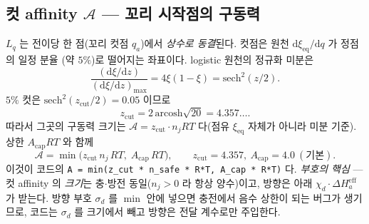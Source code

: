 \documentclass[11pt,a4paper]{article}
\newcommand{\dd}{\mathrm{d}}
\newcommand{\eff}{\mathrm{eff}}
\newcommand{\eq}{\mathrm{eq}}
\newcommand{\code}[1]{\texttt{#1}}
\begin{document}
\subsection{컷 affinity $\mathcal A$ — 꼬리 시작점의 구동력}
$L_q$ 는 전이당 한 점(꼬리 컷점 $q_a$)에서 \emph{상수로 동결}된다. 컷점은 원천 $\dd\xi_\eq/\dd q$ 가 정점의 일정 분율
(약 $5\%$)로 떨어지는 좌표이다. logistic 원천의 정규화 미분은
\begin{equation}
\frac{(\dd\xi/\dd z)}{(\dd\xi/\dd z)_{\max}}
=4\xi(1-\xi)=\mathrm{sech}^2(z/2).
\label{eq:zcut_source}
\end{equation}
$5\%$ 컷은 $\mathrm{sech}^2(z_\mathrm{cut}/2)=0.05$ 이므로
\begin{equation}
z_\mathrm{cut}=2\,\mathrm{arcosh}\sqrt{20}=4.357\ldots .
\label{eq:zcut_value}
\end{equation}
따라서 그곳의 구동력 크기는 $\mathcal A=z_\mathrm{cut}\cdot n_jRT$ 다(점유 $\xi_\eq$ 자체가 아니라 미분 기준). 상한 $A_\mathrm{cap}RT$ 와 함께
\begin{equation}
\mathcal A=\min\!\big(z_\mathrm{cut}\,n_j\,RT,\;A_\mathrm{cap}\,RT\big),
\qquad z_\mathrm{cut}=4.357,\ A_\mathrm{cap}=4.0\ (\text{기본}).
\label{eq:Acut}
\end{equation}
이것이 코드의 \code{A = min(z\_cut * n\_safe * R*T, A\_cap * R*T)} 다. \emph{부호의 핵심} — 컷 affinity 의 \emph{크기}는
충$\cdot$방전 동일($n_j>0$ 라 항상 양수)이고, 방향은 아래 $\chi_d\cdot\Delta H_a^\eff$ 가 받는다. 방향 부호 $\sigma_d$ 를
$\min$ 안에 넣으면 충전에서 음수 상한이 되는 버그가 생기므로, 코드는 $\sigma_d$ 를 크기에서 빼고 방향은 전달 계수로만
주입한다.
\end{document}
